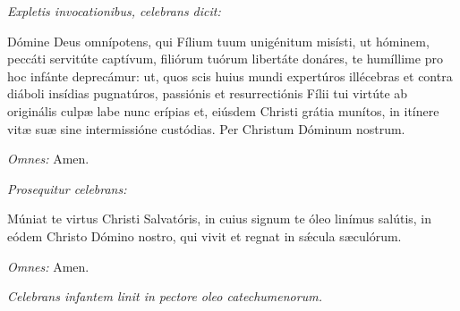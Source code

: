 \textit{Expletis invocationibus, celebrans dicit:}

Dómine Deus omnípotens,
qui Fílium tuum unigénitum misísti,
ut hóminem, peccáti servitúte captívum,
filiórum tuórum libertáte donáres,
te humíllime pro hoc infánte deprecámur:
ut, quos scis huius mundi expertúros illécebras
et contra diáboli insídias pugnatúros,
passiónis et resurrectiónis Fílii tui virtúte
ab originális culpæ labe nunc erípias
et, eiúsdem Christi grátia munítos,
in itínere vitæ suæ sine intermissióne custódias.
Per Christum Dóminum nostrum.

\textit{Omnes:} Amen.

\textit{Prosequitur celebrans:}

Múniat te virtus Christi Salvatóris,
in cuius signum te óleo linímus salútis,
in eódem Christo Dómino nostro,
qui vivit et regnat in sǽcula sæculórum.

\textit{Omnes:} Amen.

\textit{Celebrans infantem linit in pectore oleo catechumenorum.}
